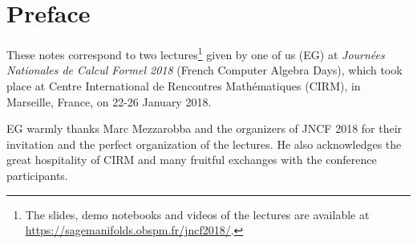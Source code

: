 \chapter*{Preface}
These notes correspond to two lectures\footnote{The slides, demo
notebooks and videos of the lectures are available at\\ \url{https://sagemanifolds.obspm.fr/jncf2018/}.} given by one of us (EG)
at \emph{Journées Nationales de Calcul Formel 2018}  (French Computer Algebra Days),
which took place at Centre International de Rencontres Mathématiques (CIRM),
in Marseille, France, on 22-26 January 2018.

EG warmly thanks Marc Mezzarobba and the organizers of JNCF 2018 for their
invitation and the perfect organization of the lectures. He also acknowledges
the great hospitality of CIRM and many fruitful exchanges with the conference
participants.
